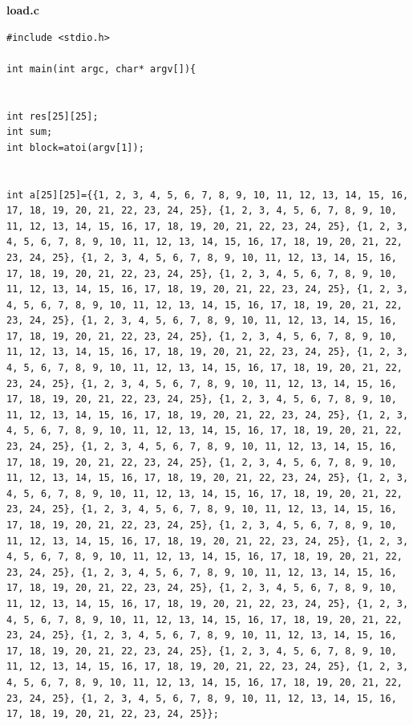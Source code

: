 \documentclass[10pt,a4paper]{article}
\begin{document}
\textbf{load.c}
\begin{lstlisting}
#include <stdio.h>

int main(int argc, char* argv[]){


int res[25][25];
int sum;
int block=atoi(argv[1]);


int a[25][25]={{1, 2, 3, 4, 5, 6, 7, 8, 9, 10, 11, 12, 13, 14, 15, 16, 17, 18, 19, 20, 21, 22, 23, 24, 25}, {1, 2, 3, 4, 5, 6, 7, 8, 9, 10, 11, 12, 13, 14, 15, 16, 17, 18, 19, 20, 21, 22, 23, 24, 25}, {1, 2, 3, 4, 5, 6, 7, 8, 9, 10, 11, 12, 13, 14, 15, 16, 17, 18, 19, 20, 21, 22, 23, 24, 25}, {1, 2, 3, 4, 5, 6, 7, 8, 9, 10, 11, 12, 13, 14, 15, 16, 17, 18, 19, 20, 21, 22, 23, 24, 25}, {1, 2, 3, 4, 5, 6, 7, 8, 9, 10, 11, 12, 13, 14, 15, 16, 17, 18, 19, 20, 21, 22, 23, 24, 25}, {1, 2, 3, 4, 5, 6, 7, 8, 9, 10, 11, 12, 13, 14, 15, 16, 17, 18, 19, 20, 21, 22, 23, 24, 25}, {1, 2, 3, 4, 5, 6, 7, 8, 9, 10, 11, 12, 13, 14, 15, 16, 17, 18, 19, 20, 21, 22, 23, 24, 25}, {1, 2, 3, 4, 5, 6, 7, 8, 9, 10, 11, 12, 13, 14, 15, 16, 17, 18, 19, 20, 21, 22, 23, 24, 25}, {1, 2, 3, 4, 5, 6, 7, 8, 9, 10, 11, 12, 13, 14, 15, 16, 17, 18, 19, 20, 21, 22, 23, 24, 25}, {1, 2, 3, 4, 5, 6, 7, 8, 9, 10, 11, 12, 13, 14, 15, 16, 17, 18, 19, 20, 21, 22, 23, 24, 25}, {1, 2, 3, 4, 5, 6, 7, 8, 9, 10, 11, 12, 13, 14, 15, 16, 17, 18, 19, 20, 21, 22, 23, 24, 25}, {1, 2, 3, 4, 5, 6, 7, 8, 9, 10, 11, 12, 13, 14, 15, 16, 17, 18, 19, 20, 21, 22, 23, 24, 25}, {1, 2, 3, 4, 5, 6, 7, 8, 9, 10, 11, 12, 13, 14, 15, 16, 17, 18, 19, 20, 21, 22, 23, 24, 25}, {1, 2, 3, 4, 5, 6, 7, 8, 9, 10, 11, 12, 13, 14, 15, 16, 17, 18, 19, 20, 21, 22, 23, 24, 25}, {1, 2, 3, 4, 5, 6, 7, 8, 9, 10, 11, 12, 13, 14, 15, 16, 17, 18, 19, 20, 21, 22, 23, 24, 25}, {1, 2, 3, 4, 5, 6, 7, 8, 9, 10, 11, 12, 13, 14, 15, 16, 17, 18, 19, 20, 21, 22, 23, 24, 25}, {1, 2, 3, 4, 5, 6, 7, 8, 9, 10, 11, 12, 13, 14, 15, 16, 17, 18, 19, 20, 21, 22, 23, 24, 25}, {1, 2, 3, 4, 5, 6, 7, 8, 9, 10, 11, 12, 13, 14, 15, 16, 17, 18, 19, 20, 21, 22, 23, 24, 25}, {1, 2, 3, 4, 5, 6, 7, 8, 9, 10, 11, 12, 13, 14, 15, 16, 17, 18, 19, 20, 21, 22, 23, 24, 25}, {1, 2, 3, 4, 5, 6, 7, 8, 9, 10, 11, 12, 13, 14, 15, 16, 17, 18, 19, 20, 21, 22, 23, 24, 25}, {1, 2, 3, 4, 5, 6, 7, 8, 9, 10, 11, 12, 13, 14, 15, 16, 17, 18, 19, 20, 21, 22, 23, 24, 25}, {1, 2, 3, 4, 5, 6, 7, 8, 9, 10, 11, 12, 13, 14, 15, 16, 17, 18, 19, 20, 21, 22, 23, 24, 25}, {1, 2, 3, 4, 5, 6, 7, 8, 9, 10, 11, 12, 13, 14, 15, 16, 17, 18, 19, 20, 21, 22, 23, 24, 25}, {1, 2, 3, 4, 5, 6, 7, 8, 9, 10, 11, 12, 13, 14, 15, 16, 17, 18, 19, 20, 21, 22, 23, 24, 25}, {1, 2, 3, 4, 5, 6, 7, 8, 9, 10, 11, 12, 13, 14, 15, 16, 17, 18, 19, 20, 21, 22, 23, 24, 25}};

\end{lstlisting}
\end{document}
